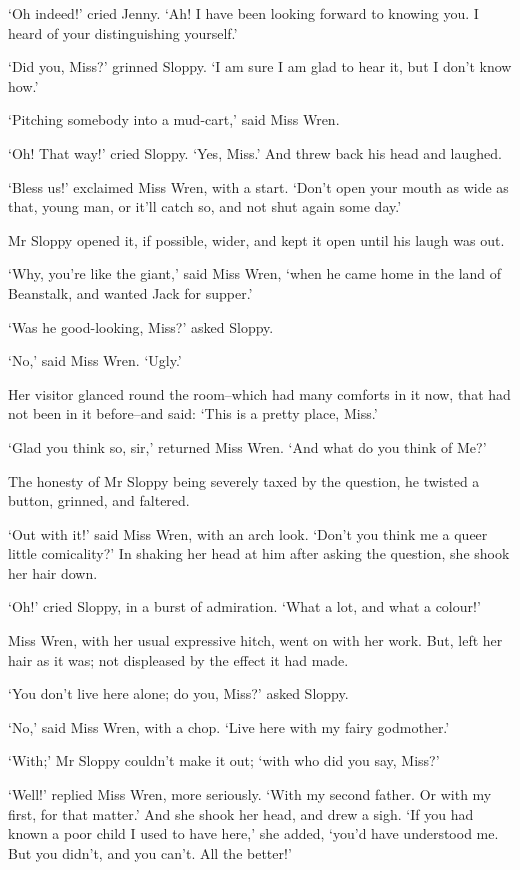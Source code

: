 ‘Oh indeed!’ cried Jenny. ‘Ah! I have been looking forward to knowing
you. I heard of your distinguishing yourself.’

‘Did you, Miss?’ grinned Sloppy. ‘I am sure I am glad to hear it, but I
don’t know how.’

‘Pitching somebody into a mud-cart,’ said Miss Wren.

‘Oh! That way!’ cried Sloppy. ‘Yes, Miss.’ And threw back his head and
laughed.

‘Bless us!’ exclaimed Miss Wren, with a start. ‘Don’t open your mouth
as wide as that, young man, or it’ll catch so, and not shut again some
day.’

Mr Sloppy opened it, if possible, wider, and kept it open until his
laugh was out.

‘Why, you’re like the giant,’ said Miss Wren, ‘when he came home in the
land of Beanstalk, and wanted Jack for supper.’

‘Was he good-looking, Miss?’ asked Sloppy.

‘No,’ said Miss Wren. ‘Ugly.’

Her visitor glanced round the room--which had many comforts in it now,
that had not been in it before--and said: ‘This is a pretty place,
Miss.’

‘Glad you think so, sir,’ returned Miss Wren. ‘And what do you think of
Me?’

The honesty of Mr Sloppy being severely taxed by the question, he
twisted a button, grinned, and faltered.

‘Out with it!’ said Miss Wren, with an arch look. ‘Don’t you think me
a queer little comicality?’ In shaking her head at him after asking the
question, she shook her hair down.

‘Oh!’ cried Sloppy, in a burst of admiration. ‘What a lot, and what a
colour!’

Miss Wren, with her usual expressive hitch, went on with her work. But,
left her hair as it was; not displeased by the effect it had made.

‘You don’t live here alone; do you, Miss?’ asked Sloppy.

‘No,’ said Miss Wren, with a chop. ‘Live here with my fairy godmother.’

‘With;’ Mr Sloppy couldn’t make it out; ‘with who did you say, Miss?’

‘Well!’ replied Miss Wren, more seriously. ‘With my second father. Or
with my first, for that matter.’ And she shook her head, and drew a
sigh. ‘If you had known a poor child I used to have here,’ she added,
‘you’d have understood me. But you didn’t, and you can’t. All the
better!’

